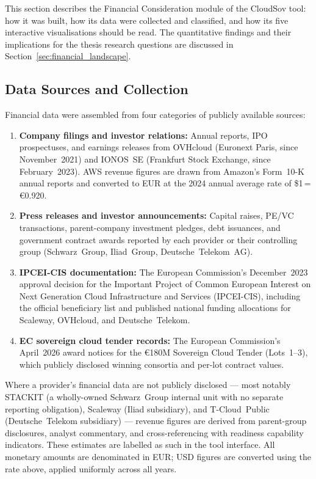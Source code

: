 This section describes the Financial Consideration module of the CloudSov tool: how it was built, how its data were collected and classified, and how its five interactive visualisations should be read. The quantitative findings and their implications for the thesis research questions are discussed in Section~\ref{sec:financial_landscape}.

\subsection{Data Sources and Collection}
\label{subsec:financial_data_sources}

Financial data were assembled from four categories of publicly available sources:

\begin{enumerate}
  \item \textbf{Company filings and investor relations:} Annual reports, IPO prospectuses, and earnings releases from OVHcloud (Euronext Paris, since November~2021) and IONOS~SE (Frankfurt Stock Exchange, since February~2023). AWS revenue figures are drawn from Amazon's Form~10-K annual reports and converted to EUR at the 2024 annual average rate of \$1\,=\,€0.920.
  \item \textbf{Press releases and investor announcements:} Capital raises, PE/VC transactions, parent-company investment pledges, debt issuances, and government contract awards reported by each provider or their controlling group (Schwarz~Group, Iliad~Group, Deutsche~Telekom~AG).
  \item \textbf{IPCEI-CIS documentation:} The European Commission's December~2023 approval decision for the Important Project of Common European Interest on Next Generation Cloud Infrastructure and Services (IPCEI-CIS), including the official beneficiary list and published national funding allocations for Scaleway, OVHcloud, and Deutsche~Telekom.
  \item \textbf{EC sovereign cloud tender records:} The European Commission's April~2026 award notices for the €180M Sovereign Cloud Tender (Lots~1--3), which publicly disclosed winning consortia and per-lot contract values.
\end{enumerate}

Where a provider's financial data are not publicly disclosed --- most notably STACKIT (a wholly-owned Schwarz~Group internal unit with no separate reporting obligation), Scaleway (Iliad subsidiary), and T-Cloud~Public (Deutsche~Telekom subsidiary) --- revenue figures are derived from parent-group disclosures, analyst commentary, and cross-referencing with readiness capability indicators. These estimates are labelled as such in the tool interface. All monetary amounts are denominated in EUR; USD figures are converted using the rate above, applied uniformly across all years.

